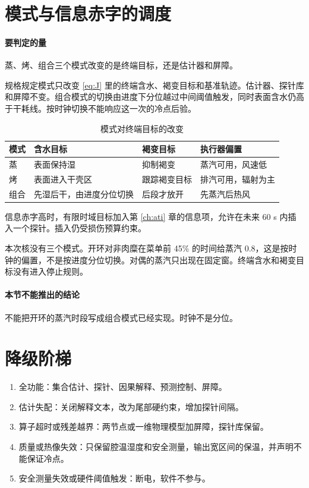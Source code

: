 \section{模式与信息赤字的调度}

\paragraph{要判定的量}
蒸、烤、组合三个模式改变的是终端目标，还是估计器和屏障。

规格规定模式只改变 \eqref{eq:J} 里的终端含水、褐变目标和基准轨迹。估计器、探针库和屏障不变。组合模式的切换由进度下分位越过中间阈值触发，同时表面含水仍高于干耗线。按时钟切换不能响应这一次的冷点后验。

\begin{table}[ht]
\centering
\caption{模式对终端目标的改变}
\begin{tabularx}{\textwidth}{lXXX}
\toprule
模式 & 含水目标 & 褐变目标 & 执行器偏置 \\
\midrule
蒸 & 表面保持湿 & 抑制褐变 & 蒸汽可用，风速低 \\
烤 & 表面进入干壳区 & 跟踪褐变目标 & 排汽可用，辐射为主 \\
组合 & 先湿后干，由进度分位切换 & 后段才放开 & 先蒸汽后热风 \\
\bottomrule
\end{tabularx}
\end{table}

信息赤字高时，有限时域目标加入第 \ref{ch:ati} 章的信息项，允许在未来 60 s 内插入一个探针。插入仍受损伤预算约束。

本次核没有三个模式。开环对非肉糜在菜单前 45\% 的时间给蒸汽 0.8，这是按时钟的偏置，不是按进度分位切换。对偶的蒸汽只出现在固定窗。终端含水和褐变目标没有进入停止规则。

\paragraph{本节不能推出的结论}
不能把开环的蒸汽时段写成组合模式已经实现。时钟不是分位。

\section{降级阶梯}

\begin{enumerate}
\item 全功能：集合估计、探针、因果解释、预测控制、屏障。
\item 估计失配：关闭解释文本，改为尾部硬约束，增加探针间隔。
\item 算子超时或残差越界：两节点或一维物理模型加屏障，探针库保留。
\item 质量或热像失效：只保留腔温湿度和安全测量，输出宽区间的保温，并声明不能保证冷点。
\item 安全测量失效或硬件阈值触发：断电，软件不参与。
\end{enumerate}

